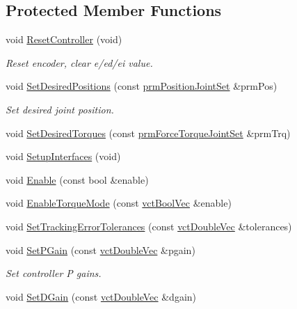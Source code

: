 \subsection*{Protected Member Functions}
\begin{DoxyCompactItemize}
\item 
void \hyperlink{classmts_p_i_d_a3030a3b45b3705758cd6eb48d9983167}{Reset\+Controller} (void)
\begin{DoxyCompactList}\small\item\em Reset encoder, clear e/ed/ei value. \end{DoxyCompactList}\item 
void \hyperlink{classmts_p_i_d_a1fd56ab7aabfbf9e3d5a37bf3cda48b9}{Set\+Desired\+Positions} (const \hyperlink{classprm_position_joint_set}{prm\+Position\+Joint\+Set} \&prm\+Pos)
\begin{DoxyCompactList}\small\item\em Set desired joint position. \end{DoxyCompactList}\item 
void \hyperlink{classmts_p_i_d_a760420b20627be81350ef7cd096efe70}{Set\+Desired\+Torques} (const \hyperlink{classprm_force_torque_joint_set}{prm\+Force\+Torque\+Joint\+Set} \&prm\+Trq)
\item 
void \hyperlink{classmts_p_i_d_a8d6efcccfaa3a7a27dcb0a319c02723d}{Setup\+Interfaces} (void)
\item 
void \hyperlink{classmts_p_i_d_a0f04c1c727087cc07110a1d45c4e8d08}{Enable} (const bool \&enable)
\item 
void \hyperlink{classmts_p_i_d_a075d4b5fa191ff9a50b5bd0b54155428}{Enable\+Torque\+Mode} (const \hyperlink{vct_dynamic_vector_types_8h_aeb2237c134aee3769198bd9d55c8a9e0}{vct\+Bool\+Vec} \&enable)
\item 
void \hyperlink{classmts_p_i_d_a492f7d1e52d94f8b42ddf727482f489c}{Set\+Tracking\+Error\+Tolerances} (const \hyperlink{vct_dynamic_vector_types_8h_ade4b3068c86fb88f41af2e5187e491c2}{vct\+Double\+Vec} \&tolerances)
\item 
void \hyperlink{classmts_p_i_d_a31ffe826ec92dd565bc33f797567e371}{Set\+P\+Gain} (const \hyperlink{vct_dynamic_vector_types_8h_ade4b3068c86fb88f41af2e5187e491c2}{vct\+Double\+Vec} \&pgain)
\begin{DoxyCompactList}\small\item\em Set controller P gains. \end{DoxyCompactList}\item 
void \hyperlink{classmts_p_i_d_afadd530f96fa2d69c8140482680f3b61}{Set\+D\+Gain} (const \hyperlink{vct_dynamic_vector_types_8h_ade4b3068c86fb88f41af2e5187e491c2}{vct\+Double\+Vec} \&dgain)

\end{DoxyCompactItemize}
